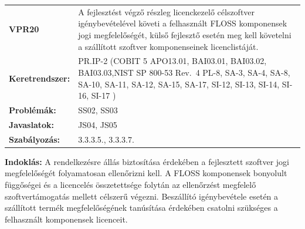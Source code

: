 \documentclass[12pt,magyar,a4paper,oneside]{scrreprt}
\begin{document}
\begin{longtable}[]{@{}ll@{}}
\toprule
\endhead
\begin{minipage}[t]{0.16\columnwidth}\raggedright
\textbf{VPR20}\strut
\end{minipage} & \begin{minipage}[t]{0.79\columnwidth}\raggedright
A fejlesztést végző részleg licenckezelő célszoftver igénybevételével
követi a felhasznált FLOSS komponensek jogi megfelelőségét, külső
fejlesztő esetén meg kell követelni a szállított szoftver komponenseinek
licenclistáját.\strut
\end{minipage}\tabularnewline
\begin{minipage}[t]{0.16\columnwidth}\raggedright
\textbf{Keretrendszer:}\strut
\end{minipage} & \begin{minipage}[t]{0.79\columnwidth}\raggedright
PR.IP-2 (COBIT 5 APO13.01, BAI03.01, BAI03.02, BAI03.03,NIST SP 800-53
Rev.~4 PL-8, SA-3, SA-4, SA-8, SA-10, SA-11, SA-12, SA-15, SA-17, SI-12,
SI-13, SI-14, SI-16, SI-17 )\strut
\end{minipage}\tabularnewline
\begin{minipage}[t]{0.16\columnwidth}\raggedright
\textbf{Problémák:}\strut
\end{minipage} & \begin{minipage}[t]{0.79\columnwidth}\raggedright
SS02, SS03\strut
\end{minipage}\tabularnewline
\begin{minipage}[t]{0.16\columnwidth}\raggedright
\textbf{Javaslatok:}\strut
\end{minipage} & \begin{minipage}[t]{0.79\columnwidth}\raggedright
JS04, JS05\strut
\end{minipage}\tabularnewline
\begin{minipage}[t]{0.16\columnwidth}\raggedright
\textbf{Szabályozás:}\strut
\end{minipage} & \begin{minipage}[t]{0.79\columnwidth}\raggedright
3.3.3.5., 3.3.3.7.\strut
\end{minipage}\tabularnewline
\bottomrule
\end{longtable}

\textbf{Indoklás: } A rendelkezésre állás biztosítása érdekében a
fejlesztett szoftver jogi megfelelőségét folyamatosan ellenőrizni kell.
A FLOSS komponensek bonyolult függőségei és a licencelés összetettsége
folytán az ellenőrzést megfelelő szoftvertámogatás mellett célszerű
végezni. Beszállító igénybevétele esetén a szállított termék
megfelelőségének tanúsítása érdekében csatolni szükséges a felhasznált
komponensek licenceit.
\end{document}
